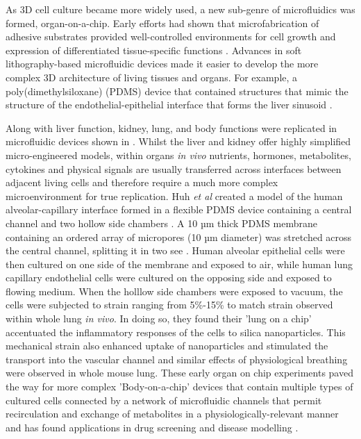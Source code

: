 As 3D cell culture became more widely used, a new sub-genre of microfluidics was formed, organ-on-a-chip. Early efforts had shown
that microfabrication of adhesive substrates provided well-controlled environments for cell growth and expression of differentiated tissue-specific functions
\citep{chen1997geometric,bhatia1999effect}. Advances in soft lithography-based microfluidic devices made it easier
to develop the more complex 3D architecture of living tissues and organs. For example, a poly(dimethylsiloxane) (PDMS) device
that contained structures that mimic the structure of the endothelial-epithelial interface that forms the liver sinusoid \citep{nakao2011bile}.

Along with liver function, kidney, lung, and body functions were replicated in microfluidic devices shown in . Whilst the liver and kidney offer highly
simplified micro-engineered models, within organs \textit{in vivo} nutrients, hormones, metabolites, cytokines and physical signals are usually transferred across interfaces
between adjacent living cells and therefore require a much more complex microenvironment
for true replication. Huh \textit{et al} created a model of the human alveolar-capillary interface formed in a flexible
PDMS device containing a central channel and two hollow side chambers \citep{huh2010reconstituting}. A 10 µm thick PDMS membrane containing an
ordered array of micropores (10 µm diameter) was stretched across the central channel, splitting it in two see .
Human alveolar epithelial cells were then cultured on
one side of the membrane and exposed to air, while human lung capillary endothelial cells were cultured on the opposing side and exposed to flowing
medium. When the holllow side chambers were exposed to vacuum, the cells were subjected to strain ranging from 5\%-15\% to match strain observed within
whole lung \textit{in vivo}. In doing so, they found their 'lung on a chip' accentuated the inflammatory responses of the cells to silica
nanoparticles. This mechanical strain also enhanced uptake of nanoparticles and stimulated the transport into the vascular channel and
similar effects of physiological breathing were observed in whole mouse lung. These early organ on chip experiments paved the way for more complex
'Body-on-a-chip' devices that contain multiple types of cultured cells connected by a network of
microfluidic channels that permit recirculation and exchange of metabolites in a physiologically-relevant manner \citep{esch2011role} and
has found applications in drug screening and disease modelling \citep{skardal2016organoid}.


